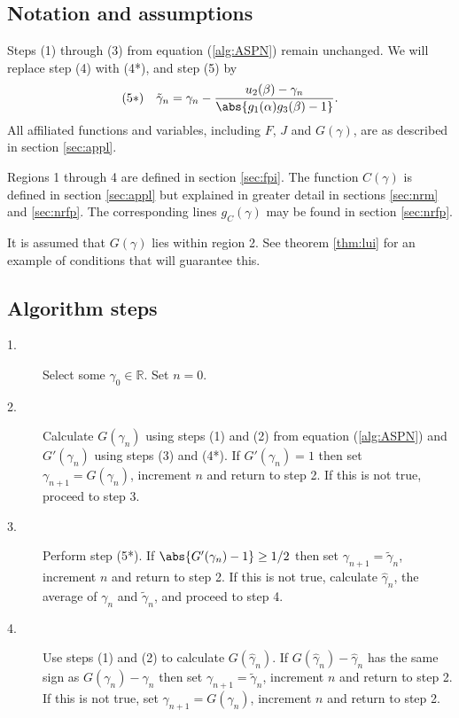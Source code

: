 \documentclass{article}
\begin{document}
\subsection{Notation and assumptions}

Steps (1) through (3) from equation (\ref{alg:ASPN}) remain unchanged.
We will replace step (4) with (4*), and step (5) by
\begin{equation*}
(5*) \quad \tilde{\gamma}_n = \gamma_n - \frac{u_2(\beta) - \gamma_n}{\abs{g_1(\alpha) g_3(\beta) - 1}} .
\end{equation*}
All affiliated functions and variables, including $F$, $J$ and $G(\gamma)$, are as described in section \ref{sec:appl}.

Regions 1 through 4 are defined in section \ref{sec:fpi}.
The function $C(\gamma)$ is defined in section \ref{sec:appl} but explained in greater detail in sections \ref{sec:nrm} and \ref{sec:nrfp}.
The corresponding lines $g_C(\gamma)$ may be found in section \ref{sec:nrfp}.

It is assumed that $G(\gamma)$ lies within region 2.
See theorem \ref{thm:lui} for an example of conditions that will guarantee this.

\subsection{Algorithm steps}

\begin{description}
\item[1.] Select some $\gamma_0 \in \mathbb{R}$. Set $n=0$.
\item[2.] Calculate $G(\gamma_n)$ using steps (1) and (2) from equation (\ref{alg:ASPN}) and $G'(\gamma_n)$ using steps (3) and (4*).
If $G'(\gamma_n) = 1$ then set $\gamma_{n+1} = G(\gamma_n)$, increment $n$ and return to step 2.
If this is not true, proceed to step 3.
\item[3.] Perform step (5*).
If $\abs{G'(\gamma_n) - 1} \geq 1/2$ then set $\gamma_{n+1} = \tilde{\gamma}_n$, increment $n$ and return to step 2.
If this is not true, calculate $\hat{\gamma}_n$, the average of $\gamma_n$ and $\tilde{\gamma}_n$, and proceed to step 4.
\item[4.] Use steps (1) and (2) to calculate $G(\hat{\gamma}_n)$.
If $G(\hat{\gamma}_n)-\hat{\gamma}_n$ has the same sign as $G(\gamma_n) - \gamma_n$ then set $\gamma_{n+1} = \tilde{\gamma}_n$, increment $n$ and return to step 2.
If this is not true, set $\gamma_{n+1} = G(\gamma_n)$, increment $n$ and return to step 2.
\end{description}
\end{document}
